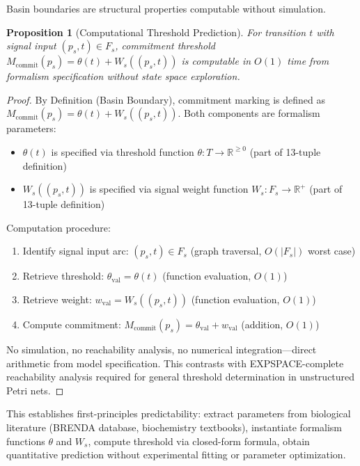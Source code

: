\documentclass[10pt,letterpaper]{article}
\newtheorem{proposition}{Proposition}
\begin{document}
Basin boundaries are structural properties computable without simulation.

\begin{proposition}[Computational Threshold Prediction]
For transition $t$ with signal input $(p_s,t) \in F_s$, commitment threshold $M_{\text{commit}}(p_s) = \theta(t) + W_s((p_s,t))$ is computable in $O(1)$ time from formalism specification without state space exploration.
\end{proposition}

\begin{proof}
By Definition (Basin Boundary), commitment marking is defined as $M_{\text{commit}}(p_s) = \theta(t) + W_s((p_s,t))$. Both components are formalism parameters:
\begin{itemize}
\item $\theta(t)$ is specified via threshold function $\theta: T \rightarrow \mathbb{R}^{\geq 0}$ (part of 13-tuple definition)
\item $W_s((p_s,t))$ is specified via signal weight function $W_s: F_s \rightarrow \mathbb{R}^+$ (part of 13-tuple definition)
\end{itemize}

Computation procedure:
\begin{enumerate}
\item Identify signal input arc: $(p_s,t) \in F_s$ (graph traversal, $O(|F_s|)$ worst case)
\item Retrieve threshold: $\theta_{\text{val}} = \theta(t)$ (function evaluation, $O(1)$)
\item Retrieve weight: $w_{\text{val}} = W_s((p_s,t))$ (function evaluation, $O(1)$)
\item Compute commitment: $M_{\text{commit}}(p_s) = \theta_{\text{val}} + w_{\text{val}}$ (addition, $O(1)$)
\end{enumerate}

No simulation, no reachability analysis, no numerical integration---direct arithmetic from model specification. This contrasts with EXPSPACE-complete reachability analysis required for general threshold determination in unstructured Petri nets.
\end{proof}

This establishes first-principles predictability: extract parameters from biological literature (BRENDA database, biochemistry textbooks), instantiate formalism functions $\theta$ and $W_s$, compute threshold via closed-form formula, obtain quantitative prediction without experimental fitting or parameter optimization.
\end{document}
